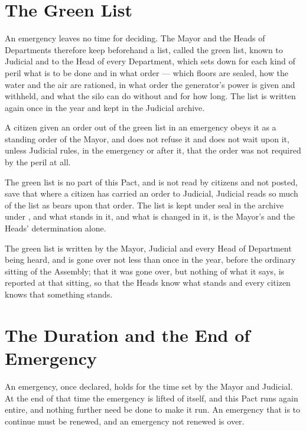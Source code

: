 \section{The Green List}
\label{sec:emergency:green-list}

An emergency leaves no time for deciding. The Mayor and the Heads of Departments therefore keep beforehand a list, called the green list, known to Judicial and to the Head of every Department, which sets down for each kind of peril what is to be done and in what order --- which floors are sealed, how the water and the air are rationed, in what order the generator's power is given and withheld, and what the silo can do without and for how long. The list is written again once in the year and kept in the Judicial archive.

\begin{clauses}
\item A citizen given an order out of the green list in an emergency obeys it as a standing order of the Mayor, and does not refuse it and does not wait upon it, unless Judicial rules, in the emergency or after it, that the order was not required by the peril at all.
\item The green list is no part of this Pact, and is not read by citizens and not posted, save that where a citizen has carried an order to Judicial, Judicial reads so much of the list as bears upon that order. The list is kept under seal in the archive under , and what stands in it, and what is changed in it, is the Mayor's and the Heads' determination alone.
\item The green list is written by the Mayor, Judicial and every Head of Department being heard, and is gone over not less than once in the year, before the ordinary sitting of the Assembly; that it was gone over, but nothing of what it says, is reported at that sitting, so that the Heads know what stands and every citizen knows that something stands.
\end{clauses}

\section{The Duration and the End of Emergency}
\label{sec:emergency:duration-and-the-end-of-emergency}

An emergency, once declared, holds for the time set by the Mayor and Judicial. At the end of that time the emergency is lifted of itself, and this Pact runs again entire, and nothing further need be done to make it run. An emergency that is to continue must be renewed, and an emergency not renewed is over.

